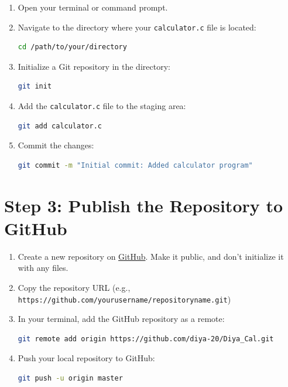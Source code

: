 \documentclass[12pt, a4paper]{article}
\begin{document}
\begin{enumerate}
    \item Open your terminal or command prompt.
    \item Navigate to the directory where your \texttt{calculator.c} file is located:
    
    \begin{lstlisting}[language=bash, basicstyle=\ttfamily\footnotesize]
cd /path/to/your/directory
    \end{lstlisting}
    
    \item Initialize a Git repository in the directory:
    
    \begin{lstlisting}[language=bash, basicstyle=\ttfamily\footnotesize]
git init
    \end{lstlisting}
    
    \item Add the \texttt{calculator.c} file to the staging area:
    
    \begin{lstlisting}[language=bash, basicstyle=\ttfamily\footnotesize]
git add calculator.c
    \end{lstlisting}
    
    \item Commit the changes:
    
    \begin{lstlisting}[language=bash, basicstyle=\ttfamily\footnotesize]
git commit -m "Initial commit: Added calculator program"
    \end{lstlisting}
\end{enumerate}

\section*{Step 3: Publish the Repository to GitHub}

\begin{small}
\begin{enumerate}
    \item Create a new repository on \href{https://github.com}{GitHub}. Make it public, and don't initialize it with any files.
    \item Copy the repository URL (e.g., \texttt{https://github.com/yourusername/repositoryname.git})
    \item In your terminal, add the GitHub repository as a remote:
    
    \begin{lstlisting}[language=bash, basicstyle=\ttfamily\footnotesize]
git remote add origin https://github.com/diya-20/Diya_Cal.git
    \end{lstlisting}
    
    \item Push your local repository to GitHub:
    
    \begin{lstlisting}[language=bash, basicstyle=\ttfamily\footnotesize]
git push -u origin master
    \end{lstlisting}
\end{enumerate}
\end{small}
\end{document}

